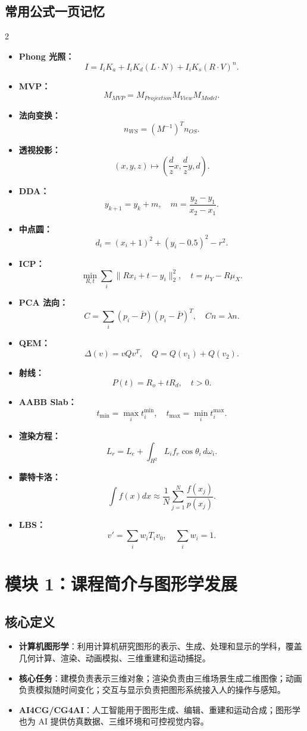 \documentclass[UTF8,zihao=-4,scheme=chinese,fontset=fandol]{ctexart}
\newcommand{\key}[1]{\textbf{#1}}
\begin{document}
\subsection{常用公式一页记忆}
\begin{multicols}{2}
\begin{itemize}
  \item \key{Phong 光照：}
  \[
  I=I_iK_a+I_iK_d(L\cdot N)+I_iK_s(R\cdot V)^n .
  \]
  \item \key{MVP：}
  \[
  M_{MVP}=M_{Projection}M_{View}M_{Model}.
  \]
  \item \key{法向变换：}
  \[
  n_{WS}=(M^{-1})^T n_{OS}.
  \]
  \item \key{透视投影：}
  \[
  (x,y,z)\mapsto \left(\frac{d}{z}x,\frac{d}{z}y,d\right).
  \]
  \item \key{DDA：}
  \[
  y_{k+1}=y_k+m,\quad m=\frac{y_2-y_1}{x_2-x_1}.
  \]
  \item \key{中点圆：}
  \[
  d_i=(x_i+1)^2+(y_i-0.5)^2-r^2.
  \]
  \item \key{ICP：}
  \[
  \min_{R,t}\sum_i\|Rx_i+t-y_i\|_2^2,\quad t=\mu_Y-R\mu_X.
  \]
  \item \key{PCA 法向：}
  \[
  C=\sum_i(p_i-\bar P)(p_i-\bar P)^T,\quad Cn=\lambda n.
  \]
  \item \key{QEM：}
  \[
  \Delta(v)=vQv^T,\quad Q=Q(v_1)+Q(v_2).
  \]
  \item \key{射线：}
  \[
  P(t)=R_o+tR_d,\quad t>0.
  \]
  \item \key{AABB Slab：}
  \[
  t_{\min}=\max_i t_i^{\min},\quad t_{\max}=\min_i t_i^{\max}.
  \]
  \item \key{渲染方程：}
  \[
  L_r=L_e+\int_{H^2}L_i f_r\cos\theta_i\,d\omega_i.
  \]
  \item \key{蒙特卡洛：}
  \[
  \int f(x)dx\approx \frac1N\sum_{j=1}^N \frac{f(x_j)}{p(x_j)}.
  \]
  \item \key{LBS：}
  \[
  v'=\sum_i w_iT_iv_0,\quad \sum_i w_i=1.
  \]
\end{itemize}
\end{multicols}

\section{模块 1：课程简介与图形学发展}

\subsection{核心定义}
\begin{itemize}
  \item \key{计算机图形学}：利用计算机研究图形的表示、生成、处理和显示的学科，覆盖几何计算、渲染、动画模拟、三维重建和运动捕捉。
  \item \key{核心任务}：建模负责表示三维对象；渲染负责由三维场景生成二维图像；动画负责模拟随时间变化；交互与显示负责把图形系统接入人的操作与感知。
  \item \key{AI4CG/CG4AI}：人工智能用于图形生成、编辑、重建和运动合成；图形学也为 AI 提供仿真数据、三维环境和可控视觉内容。
\end{itemize}
\end{document}

